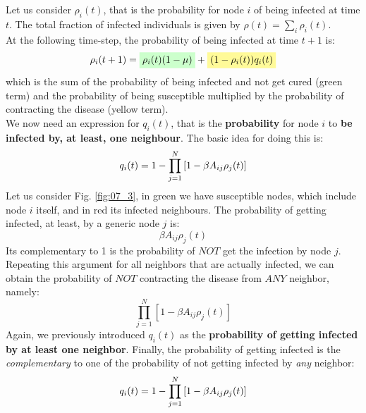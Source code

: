 \documentclass[../main/main.tex]{subfiles}
\begin{document}
Let us consider \( \rho _i (t) \), that is the probability for node $i$ of being infected at time \( t \). The total fraction of infected individuals is given by \( \rho (t) = \sum_{i}^{} \rho _i (t)   \).\\
At the following time-step, the probability of being infected at time \( t+1 \) is:
\begin{equation}
  \rho _i (t+1) = \mathcolorbox{green!20}{\rho _i(t) (1- \mu )} + \mathcolorbox{yellow!40}{(1 - \rho _i(t))q_i(t)}
  \label{eqn:SIR_IBMF}
\end{equation}
which is the sum of the probability of being infected and not get cured (green term) and the probability of being susceptible multiplied by the probability of contracting the disease (yellow term).\\
We now need an expression for \( q_i(t) \), that is the \textbf{probability} for node \( i \) to \textbf{be infected by, at least, one neighbour}. The basic idea for doing this is:
\begin{equation}
  q_i (t) = 1 - \prod_{j=1}^{N} \qty[1- \beta A_{ij} \rho _j (t)]
\end{equation}
Let us consider Fig. \ref{fig:07_3}, in green we have susceptible nodes, which include node \( i \) itself, and in red its infected neighbours.
The probability of getting infected, at least, by a generic node $j$ is:
\begin{equation}
   \beta A_{ij} \rho _j (t) 
\end{equation}
Its complementary to 1 is the probability of $NOT$ get the infection by node $j$.  
\begin{equation}
   [1- \beta A_{ij} \rho _j (t)] 
\end{equation}
Repeating this argument for all neighbors that are actually infected, we can obtain the probability of $NOT$ contracting the disease from $ANY$ neighbor, namely:
\begin{equation}
    \prod_{j=1}^{N} [1- \beta A_{ij} \rho _j (t)]
\end{equation}
Again, we previously introduced \(   q_i (t) \) as the \textbf{probability of getting infected by at least one neighbor}. Finally, the probability of getting infected is the \textit{complementary} to one of the probability of not getting infected by \textit{any} neighbor:
\begin{equation}
  q_i (t) = 1 - \prod_{j=1}^{N} \qty[1- \beta A_{ij} \rho _j (t)]
\end{equation}
\end{document}
